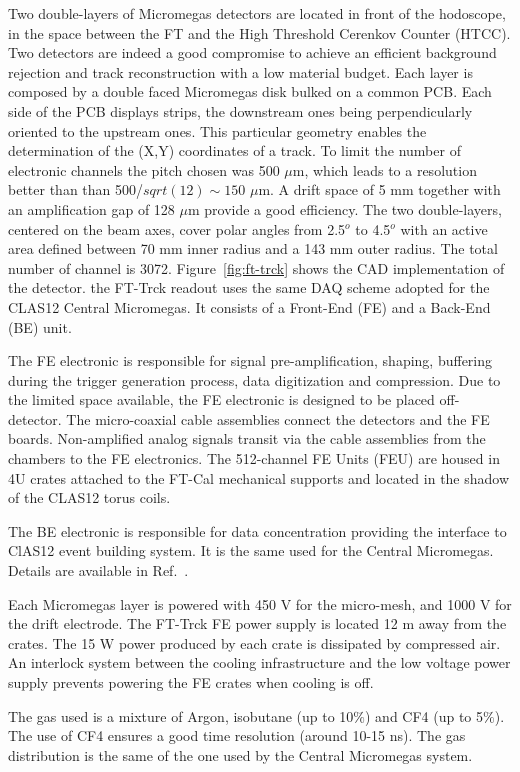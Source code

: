 Two double-layers of Micromegas detectors
are located in front of the hodoscope, in the space between the FT
and the High Threshold Cerenkov Counter
(HTCC). Two detectors are indeed a good compromise
to achieve an efficient background rejection
and track reconstruction with a low
material budget. Each layer is
composed by a double faced Micromegas disk
bulked on a common PCB. Each side of the
PCB displays strips, the downstream ones being
perpendicularly oriented to the upstream
ones. This particular geometry enables the
determination of the (X,Y) coordinates of a
track. To limit the number of electronic channels
the pitch chosen was 500 $\mu$m, which leads
to a resolution better than than 500/$sqrt(12)\sim 150$ $\mu$m.
A drift space of 5 mm together with an amplification gap of 128  $\mu$m provide
a good efficiency.
The two double-layers, centered on the beam axes,   cover polar angles from 2.5$^o$ to 4.5$^o$ with an active area defined
between 70 mm inner radius and a 143 mm outer radius.
The total number of channel is 3072.
Figure~\ref{fig:ft-trck} shows the CAD implementation of the detector. 
the FT-Trck readout uses the same DAQ scheme adopted for the CLAS12 Central Micromegas. It  consists
of a Front-End (FE) and a  Back-End (BE) unit. 

The FE
electronic is responsible for signal pre-amplification, shaping,  buffering during the trigger generation
process, data digitization and compression.
Due to the limited space available, the FE electronic 
is designed to be placed off-detector.
The micro-coaxial cable assemblies
connect the detectors and the FE boards. Non-amplified
analog signals transit via the cable
assemblies from the chambers to the FE electronics.
The 512-channel FE Units (FEU)
 are housed in 4U crates attached to the FT-Cal mechanical supports and  located
in the shadow of the CLAS12 torus coils.

The  BE electronic is
responsible for data concentration providing the 
interface to ClAS12
event building system. It is the same used for the Central Micromegas. Details are available in Ref.~\cite{mm}.

Each Micromegas layer  is powered with 
 450 V for the micro-mesh,
and 1000 V for the drift electrode.
The FT-Trck FE power supply is located 12 m away from the crates. The 15 W power produced by each crate is dissipated  by compressed air. An interlock system between the cooling
infrastructure and the low voltage power supply
prevents powering the FE crates
when cooling is off. 

The gas used 
is a mixture of Argon, isobutane (up to
10$\%$) and CF4 (up to 5$\%$). The use of
CF4 ensures a good time resolution (around
10-15 ns). The gas distribution is the same of the one used by the Central Micromegas system.


